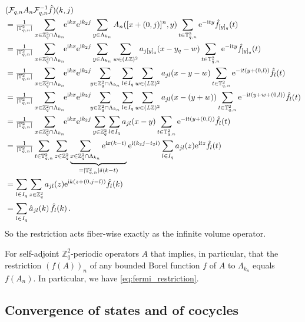 \documentclass[a4paper]{article}
\newcommand{\T}{\mathbb{T}}
\newcommand{\e}{\mathrm{e}}
\renewcommand{\i}{\mathrm{i}}
\newcommand{\Z}{\mathbb{Z}}
\theoremstyle{plain}
\theoremstyle{definition}
\theoremstyle{remark}
\renewcommand{\(}{\left(}
\renewcommand{\)}{\right)}
\begin{document}
\begin{align*}
    \hspace{0em}&\hspace{-0em} 
    (\mathcal{F}_{q,n}A_n\mathcal{F}^{-1}_{q,n} \hat f)(k,j)
    \\
    &=
    \tfrac{1}{|\T^2_{q,n}|}\sum_{x\in\Z^2_q\cap\Lambda_{k_n}}\!\!
    \e^{\i k x} \e^{\i k_2 j} \sum_{y\in\Lambda_{k_n}} A_n([x+(0,j)]^n,y) \sum_{t\in\T^2_{q,n}} \e^{-\i t y} \hat f_{[y]_q}(t)
    \\
    &=
    \tfrac{1}{|\T^2_{q,n}|}\sum_{x\in\Z^2_q\cap\Lambda_{k_n}}\!\!
    \e^{\i k x}\e^{\i k_2 j} \sum_{y\in\Lambda_{k_n}} \sum_{w\in(L\Z)^2} a_{j[y]_q}(x-y_q-w)\sum_{t\in\T^2_{q,n}} \e^{-\i t y} \hat f_{[y]_q}(t)
    \\
    &=
    \tfrac{1}{|\T^2_{q,n}|}\sum_{x\in\Z^2_q\cap\Lambda_{k_n}}\!\!
    \e^{\i k x} \e^{\i k_2 j}\!\! \sum_{y\in\Z^2_q\cap \Lambda_{k_n}  }\sum_{l\in I_q} \sum_{w\in(L\Z)^2} a_{jl}(x-y-w)\sum_{t\in\T^2_{q,n}} \e^{-\i t (y+(0,l))} \hat f_{l}(t)
    \\
    &=
    \tfrac{1}{|\T^2_{q,n}|}\sum_{x\in\Z^2_q\cap\Lambda_{k_n}}\!\!
    \e^{\i k x} \e^{\i k_2 j}\!\! \sum_{y\in\Z^2_q\cap\Lambda_{k_n}} \sum_{l\in I_q}   \sum_{w\in(L\Z)^2}a_{jl}(x-(y+w))\sum_{t\in\T^2_{q,n}} \e^{-\i t (y+w+(0,l)) } \hat f_l(t)
    \\ 
    &=
    \tfrac{1}{|\T^2_{q,n}|}\sum_{x\in\Z^2_q\cap\Lambda_{k_n}}\!\!
    \e^{\i k x} \e^{\i k_2 j} \sum_{y\in\Z^2_q} \sum_{l\in I_q}   a_{jl}(x-y)\sum_{t\in\T^2_{q,n}} \e^{-\i t (y+(0,l)) } \hat f_l(t)
    \\
    &=
    \tfrac{1}{|\T^2_{q,n}|}\sum_{t\in\T^2_{q,n}} \sum_{z\in\Z^2_q} 
    \underbrace{\sum_{x\in\Z^2_q\cap\Lambda_{k_n}}\e^{\i  x(k-t)}}_{=|\T^2_{q,n}|\delta(k-t)}
    \e^{\i (k_2 j-t_2l)} \sum_{l\in I_q}   a_{jl}(z)\e^{ \i t  z } \hat f_l(t)
    \\
    &=
    \sum_{l\in I_q} \sum_{z\in\Z^2_q}   a_{jl}(z)\e^{ \i k  (z+(0,j-l)) } \hat f_l(k)
    \\
    &=
    \sum_{l\in I_q} \hat a_{jl}(k)\,\hat f_l(k)\,.
\end{align*}
So the restriction acts fiber-wise exactly as the infinite volume operator.

For self-adjoint $\Z^2_q$-periodic operators $A$ that implies, in particular, that the restriction $(f(A))_n$ of any bounded Borel function $f$ of $A$ to $\Lambda_{k_n}$ equals $f(A_n)$. In particular,
we have \eqref{eq:fermi_restriction}. 

\subsection{Convergence of states and of cocycles} \label{sec:convergences}
\end{document}
